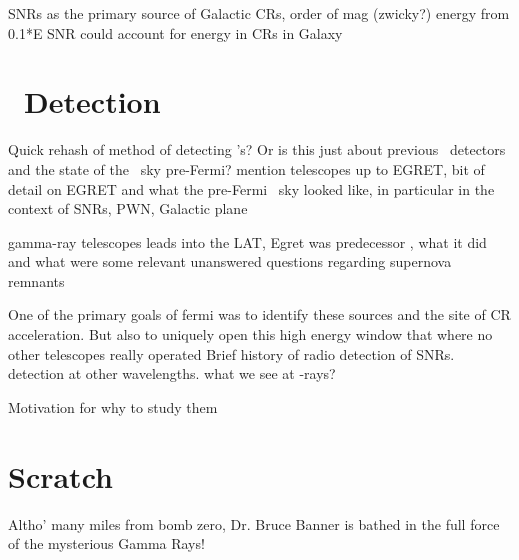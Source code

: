 SNRs as the primary source of Galactic CRs, order of mag (zwicky?) energy from 0.1*E SNR could account for energy in CRs in Galaxy

\section{\gam~Detection}\label{gamAstr:Detect}
Quick rehash of method of detecting \gam's? Or is this just about previous \gam ~detectors and the state of the \gam~sky pre-Fermi?  mention telescopes up to EGRET, bit of detail on EGRET and what the pre-Fermi \gam~sky looked like, in particular in the context of SNRs, PWN, Galactic plane

gamma-ray telescopes leads into the LAT, Egret was  predecessor , what it did and what were some relevant unanswered questions regarding supernova remnants 


One of the primary goals of fermi was to identify these sources and the site of CR acceleration. But also to uniquely open this high energy window that where no other telescopes really operated
Brief history of radio detection of SNRs. detection at other wavelengths. what we see at \g-rays?

Motivation for why to study them
\citep{Sturner95}
\citep{Esposito96}

\section{Scratch}


Altho' many miles from bomb zero, Dr. Bruce Banner is bathed in the full force of the mysterious Gamma Rays!
